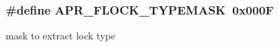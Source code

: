 \subsubsection[{\texorpdfstring{A\+P\+R\+\_\+\+F\+L\+O\+C\+K\+\_\+\+T\+Y\+P\+E\+M\+A\+SK}{APR_FLOCK_TYPEMASK}}]{\setlength{\rightskip}{0pt plus 5cm}\#define A\+P\+R\+\_\+\+F\+L\+O\+C\+K\+\_\+\+T\+Y\+P\+E\+M\+A\+SK~0x000F}\hypertarget{group__apr__file__lock__types_ga40777e364fb20bb9a9ee57e74b19c13d}{}\label{group__apr__file__lock__types_ga40777e364fb20bb9a9ee57e74b19c13d}
mask to extract lock type 
